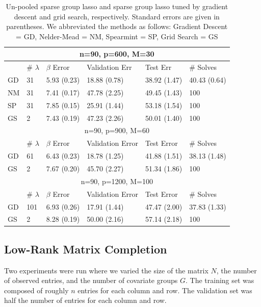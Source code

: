 \documentclass[12pt]{article}
\begin{document}
\begin{table}
\caption{\label{table:unpooled} Un-pooled sparse group lasso and sparse group lasso tuned by gradient descent and grid search, respectively. Standard errors are given in parentheses. We abbreviated the methods as follows: Gradient Descent = GD, Nelder-Mead = NM, Spearmint = SP, Grid Search = GS}
\centering
\begin{tabular}{| l | l | l | l | l | l | }
\hline
\multicolumn{6}{|c|}{n=90, p=600, M=30}\\
\hline
& \# $\lambda$ & $\beta$ Error & Validation Err & Test Err & \# Solves \\
\hline
GD & 31 & 5.93 (0.23)  & 18.88 (0.78) & 38.92 (1.47) & 40.43 (0.64) \\
\hline
NM & 31 & 7.41 (0.17) & 47.78 (2.25) & 49.45 (1.43) & 100\\
\hline
SP & 31 & 7.85 (0.15) &  25.91 (1.44) & 53.18 (1.54) & 100\\
\hline
GS & 2 & 7.43 (0.19) & 47.23 (2.26) & 50.01 (1.40) & 100 \\
\hline
\multicolumn{6}{|c|}{n=90, p=900, M=60}\\
\hline
& \# $\lambda$ & $\beta$ Error &  Validation Error & Test Error & \# Solves \\
\hline
GD & 61 & 6.43 (0.23) & 18.78 (1.25) & 41.88 (1.51) & 38.13 (1.48)\\
\hline
GS & 2 & 7.67 (0.20)  & 45.70 (2.27) & 51.34 (1.86) & 100 \\
\hline
\multicolumn{6}{|c|}{n=90, p=1200, M=100}\\
\hline
& \# $\lambda$ & $\beta$ Error & Validation Error & Test Error & \# Solves \\
\hline
GD & 101 & 6.93 (0.26) & 17.91 (1.44) & 47.47 (2.00) & 37.83 (1.33) \\
\hline
GS & 2 & 8.28 (0.19) & 50.00 (2.16) & 57.14 (2.18) & 100 \\
\hline
\end{tabular}
\end{table}

\subsection{Low-Rank Matrix Completion}\label{sec:simulation_matrix}
Two experiments were run where we varied the size of the matrix $N$, the number of observed entries, and the number of covariate groups $G$. The training set was composed of roughly $n$ entries for each column and row. The validation set was half the number of entries for each column and row.
\end{document}
